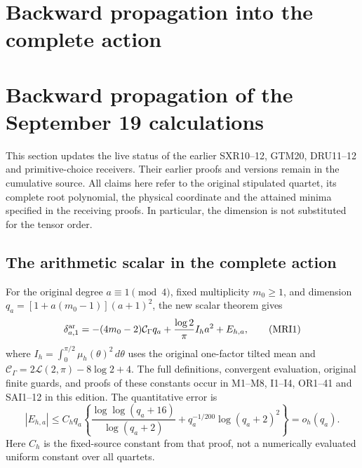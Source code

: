 \documentclass[11pt,a4paper]{article}
\begin{document}
\clearpage
\begingroup


\setcounter{equation}{0}
\renewcommand{\theequation}{MRI.\arabic{equation}}
\section*{Backward propagation into the complete action}
\section{Backward propagation of the September 19 calculations}
\label{mri:sec:multi-intake-receiver}

This section updates the live status of the earlier SXR10--12, GTM20,
DRU11--12 and primitive-choice receivers. Their earlier proofs and
versions remain in the cumulative source. All claims here refer to the
original stipulated quartet, its complete root polynomial, the physical
coordinate and the attained minima specified in the receiving proofs.
In particular, the dimension is not substituted for the tensor order.

\subsection{The arithmetic scalar in the complete action}
For the original degree $a\equiv1\pmod4$, fixed multiplicity $m_0\ge1$,
and dimension $q_a=[1+a(m_0-1)](a+1)^2$, the new scalar theorem gives
\[
 \delta_{a,1}^{\rm ar}
 =-(4m_0-2)\mathcal C_\Gamma q_a
       +\frac{\log2}{\pi}I_h a^2+E_{h,a},
 \tag{MRI1}
\]
where $I_h=\int_0^{\pi/2}\mu_h(\theta)^2\,d\theta$ uses the original
one-factor tilted mean and
$\mathcal C_\Gamma=2\mathcal L(2,\pi)-8\log2+4$.
The full definitions, convergent evaluation, original finite guards,
and proofs of these constants occur in M1--M8, I1--I4, OR1--41 and
SAI1--12 in this edition. The quantitative error is
\[
 |E_{h,a}|\le C_hq_a
 \left\{\frac{\log\log(q_a+16)}{\log(q_a+2)}
       +q_a^{-1/200}\log(q_a+2)^2\right\}=o_h(q_a).
 \tag{MRI2}
\]
Here $C_h$ is the fixed-source constant from that proof, not a
numerically evaluated uniform constant over all quartets.
\end{document}
